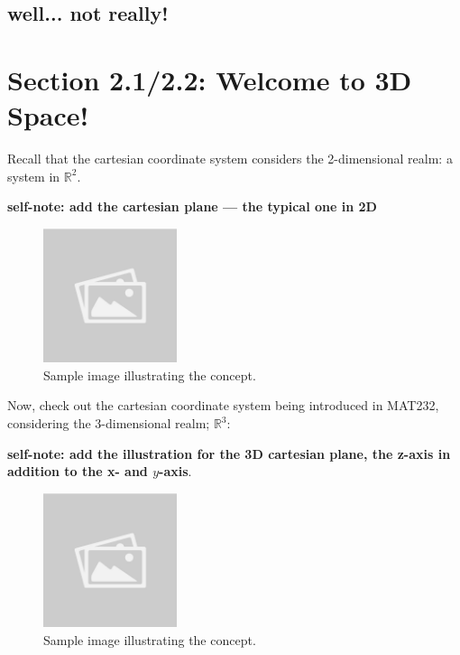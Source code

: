 \documentclass{article}
\begin{document}
\subsection*{well... not really!}

\section*{Section 2.1/2.2: Welcome to 3D Space!}
\begin{remarkbox}
Recall that the cartesian coordinate system considers the 2-dimensional realm: a system in \( \mathbb{R}^2 \).
\begin{illustrationbox}
    \textbf{self-note: add the cartesian plane — the typical one in 2D}
    \begin{figure}[H]
        \centering
        \includegraphics[width=0.35\textwidth]{sample_image.jpg}
        \caption{Sample image illustrating the concept.}
        \label{fig:sample_image}
    \end{figure}
\end{illustrationbox}
Now, check out the cartesian coordinate system being introduced in MAT232, considering the 3-dimensional realm; \( \mathbb{R}^3 \):
\begin{illustrationbox}
    \textbf{self-note: add the illustration for the 3D cartesian plane, the z-axis in addition to the x- and \( y \)-axis}.
    \begin{figure}[H]
        \centering
        \includegraphics[width=0.35\textwidth]{sample_image.jpg}
        \caption{Sample image illustrating the concept.}
        \label{fig:sample_image}
    \end{figure}
\end{illustrationbox}
\end{remarkbox}
\end{document}
